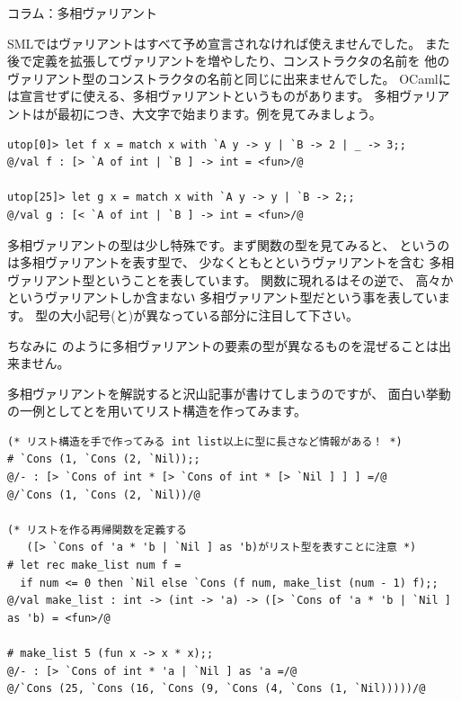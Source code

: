 \documentclass[11pt,a4paper]{jarticle}
\begin{document}
\begin{itembox}[l]{コラム：多相ヴァリアント}

SMLではヴァリアントはすべて予め宣言されなければ使えませんでした。
また後で定義を拡張してヴァリアントを増やしたり、コンストラクタの名前を
他のヴァリアント型のコンストラクタの名前と同じに出来ませんでした。
OCaml\cite{ocaml}には宣言せずに使える、多相ヴァリアントというものがあります。
多相ヴァリアントはが最初につき、大文字で始まります。例を見てみましょう。

\begin{lstlisting}[caption=多相ヴァリアント,label=code:poly-varinat]
utop[0]> let f x = match x with `A y -> y | `B -> 2 | _ -> 3;;
@/val f : [> `A of int | `B ] -> int = <fun>/@

utop[25]> let g x = match x with `A y -> y | `B -> 2;;
@/val g : [< `A of int | `B ] -> int = <fun>/@
\end{lstlisting}

多相ヴァリアントの型は少し特殊です。まず関数の型を見てみると、
\prog{[> `A of int | `B ]}というのは多相ヴァリアントを表す型で、
少なくともとというヴァリアントを含む
多相ヴァリアント型ということを表しています。
関数に現れる\prog{[< `A of int | `B ]}はその逆で、
高々かというヴァリアントしか含まない
多相ヴァリアント型だという事を表しています。
型の大小記号(\prog{>}と\prog{<})が異なっている部分に注目して下さい。

ちなみに
のように多相ヴァリアントの要素の型が異なるものを混ぜることは出来ません。

多相ヴァリアントを解説すると沢山記事が書けてしまうのですが、
面白い挙動の一例としてとを用いてリスト構造を作ってみます。

\begin{lstlisting}[caption=多相ヴァリアントを用いたリスト構造(ocamlコード)]
(* リスト構造を手で作ってみる int list以上に型に長さなど情報がある！ *)
# `Cons (1, `Cons (2, `Nil));;
@/- : [> `Cons of int * [> `Cons of int * [> `Nil ] ] ] =/@
@/`Cons (1, `Cons (2, `Nil))/@

(* リストを作る再帰関数を定義する
   ([> `Cons of 'a * 'b | `Nil ] as 'b)がリスト型を表すことに注意 *)
# let rec make_list num f =
  if num <= 0 then `Nil else `Cons (f num, make_list (num - 1) f);;
@/val make_list : int -> (int -> 'a) -> ([> `Cons of 'a * 'b | `Nil ] as 'b) = <fun>/@

# make_list 5 (fun x -> x * x);;
@/- : [> `Cons of int * 'a | `Nil ] as 'a =/@
@/`Cons (25, `Cons (16, `Cons (9, `Cons (4, `Cons (1, `Nil)))))/@


\end{lstlisting}
\end{itembox}
\end{document}

